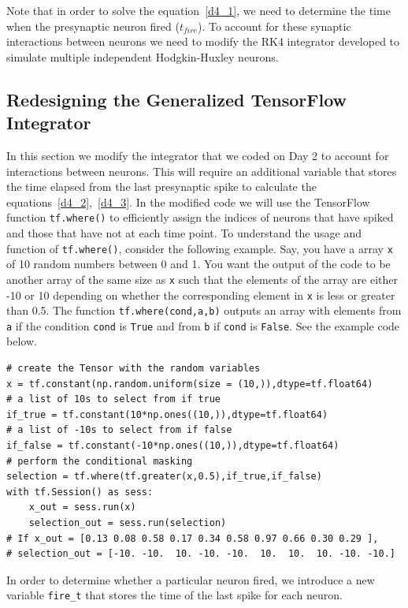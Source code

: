 \documentclass[10pt,letterpaper]{article}
\begin{document}
Note that in order to solve the equation~\ref{d4_1}, we need to determine the time when the presynaptic neuron fired ($t_{fire}$). To account for these synaptic interactions between neurons we need to modify the RK4 integrator developed to simulate multiple independent Hodgkin-Huxley neurons. 

\subsection*{Redesigning the Generalized TensorFlow Integrator}
In this section we modify the integrator that we coded on Day 2 to account for interactions between neurons. This will require an additional variable that stores the time elapsed from the last presynaptic spike to calculate the  equations~\ref{d4_2},~\ref{d4_3}. In the modified code we will use the TensorFlow function \texttt{tf.where()} to efficiently assign the indices of neurons that have spiked and those that have not at each time point. To understand the usage and function of \texttt{tf.where()}, consider the following example. Say, you have a array \texttt{x} of 10 random numbers between 0 and 1. You want the output of the code to be another array of the same size as \texttt{x} such that the elements of the array are either -10 or 10 depending on whether the corresponding element in \texttt{x} is less or greater than 0.5. The function  \texttt{tf.where(cond,a,b)} outputs an array with elements from \texttt{a} if the condition \texttt{cond} is \texttt{True} and from \texttt{b} if \texttt{cond} is \texttt{False}. See the example code below.

\begin{verbatim}
# create the Tensor with the random variables
x = tf.constant(np.random.uniform(size = (10,)),dtype=tf.float64)
# a list of 10s to select from if true
if_true = tf.constant(10*np.ones((10,)),dtype=tf.float64)
# a list of -10s to select from if false
if_false = tf.constant(-10*np.ones((10,)),dtype=tf.float64)
# perform the conditional masking
selection = tf.where(tf.greater(x,0.5),if_true,if_false)
with tf.Session() as sess:
    x_out = sess.run(x)
    selection_out = sess.run(selection)
# If x_out = [0.13 0.08 0.58 0.17 0.34 0.58 0.97 0.66 0.30 0.29 ],
# selection_out = [-10. -10.  10. -10. -10.  10.  10.  10. -10. -10.]
\end{verbatim}

In order to determine whether a particular neuron fired, we introduce a new variable \texttt{fire\_t} that stores the time of the last spike for each neuron. 
\end{document}
